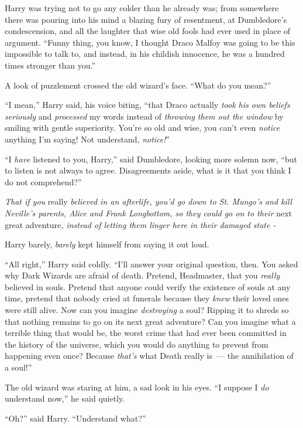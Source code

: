 Harry was trying not to go any colder than he already was; from somewhere there was pouring into his mind a blazing fury of resentment, at Dumbledore's condescension, and all the laughter that wise old fools had ever used in place of argument. ``Funny thing, you know, I thought Draco Malfoy was going to be this impossible to talk to, and instead, in his childish innocence, he was a hundred times stronger than you.''

A look of puzzlement crossed the old wizard's face. ``What do you mean?''

``I mean,'' Harry said, his voice biting, ``that Draco actually \emph{took his own beliefs seriously} and \emph{processed} my words instead of \emph{throwing them out the window} by smiling with gentle superiority. You're so old and wise, you can't even \emph{notice} anything I'm saying! Not understand, \emph{notice!}''

``I \emph{have} listened to you, Harry,'' said Dumbledore, looking more solemn now, ``but to listen is not always to agree. Disagreements aside, what is it that you think I do not comprehend?''

\emph{That if you} really \emph{believed in an afterlife, you'd go down to St. Mungo's and kill Neville's parents, Alice and Frank Longbottom, so they could go on to their} next great adventure\emph{, instead of letting them linger here in their damaged state -}

Harry barely, \emph{barely} kept himself from saying it out loud.

``All right,'' Harry said coldly. ``I'll answer your original question, then. You asked why Dark Wizards are afraid of death. Pretend, Headmaster, that you \emph{really} believed in souls. Pretend that anyone could verify the existence of souls at any time, pretend that nobody cried at funerals because they \emph{knew} their loved ones were still alive. Now can you imagine \emph{destroying} a soul? Ripping it to shreds so that nothing remains to go on its next great adventure? Can you imagine what a terrible thing that would be, the worst crime that had ever been committed in the history of the universe, which you would do anything to prevent from happening even once? Because \emph{that's} what Death really is~--- the annihilation of a soul!''

The old wizard was staring at him, a sad look in his eyes. ``I suppose I \emph{do} understand now,'' he said quietly.

``Oh?'' said Harry. ``Understand what?''

